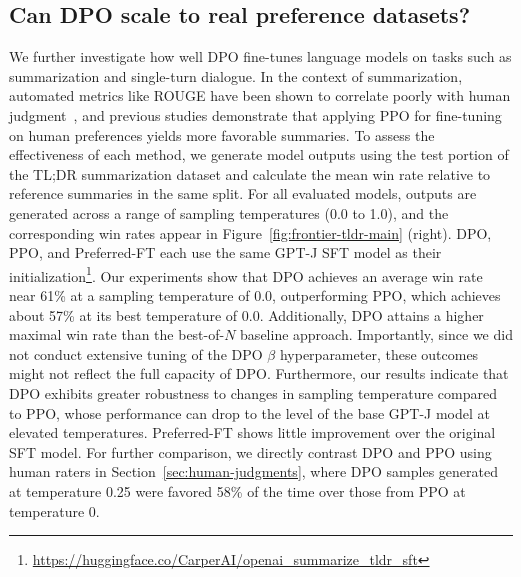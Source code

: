 \subsection{Can DPO scale to real preference datasets?}
\label{sec:dpo-real-datasets}
We further investigate how well DPO fine-tunes language models on tasks such as summarization and single-turn dialogue. In the context of summarization, automated metrics like ROUGE have been shown to correlate poorly with human judgment~\citep{stiennon2022learning}, and previous studies demonstrate that applying PPO for fine-tuning on human preferences yields more favorable summaries. To assess the effectiveness of each method, we generate model outputs using the test portion of the TL;DR summarization dataset and calculate the mean win rate relative to reference summaries in the same split. For all evaluated models, outputs are generated across a range of sampling temperatures (0.0 to 1.0), and the corresponding win rates appear in Figure~\ref{fig:frontier-tldr-main} (right). DPO, PPO, and Preferred-FT each use the same GPT-J SFT model as their initialization\footnote{\url{https://huggingface.co/CarperAI/openai_summarize_tldr_sft}}. Our experiments show that DPO achieves an average win rate near 61\% at a sampling temperature of 0.0, outperforming PPO, which achieves about 57\% at its best temperature of 0.0. Additionally, DPO attains a higher maximal win rate than the best-of-$N$ baseline approach. Importantly, since we did not conduct extensive tuning of the DPO $\beta$ hyperparameter, these outcomes might not reflect the full capacity of DPO. Furthermore, our results indicate that DPO exhibits greater robustness to changes in sampling temperature compared to PPO, whose performance can drop to the level of the base GPT-J model at elevated temperatures. Preferred-FT shows little improvement over the original SFT model. For further comparison, we directly contrast DPO and PPO using human raters in Section~\ref{sec:human-judgments}, where DPO samples generated at temperature 0.25 were favored 58\% of the time over those from PPO at temperature 0.

